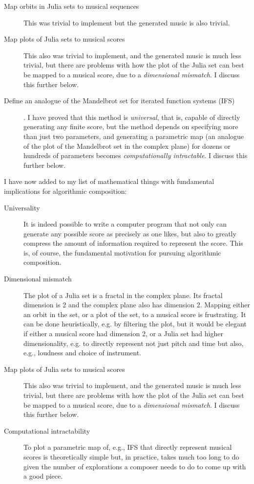 \documentclass[11pt]{amsart}
\begin{document}
\begin{description}
\item[Map orbits in Julia sets to musical sequences] This was trivial to implement but the generated music is also trivial.
\item[Map plots of Julia sets to musical scores] This also was trivial to implement, and the generated music is much less trivial, but there are problems with how the plot of the Julia set can best be mapped to a musical score, due to a \emph{dimensional mismatch}. I discuss this further below.
\item[Define an analogue of the Mandelbrot set for iterated function systems (IFS)]. I have proved that this method is \emph{universal}, that is, capable of directly generating any finite score, but the method depends on specifying more than just two parameters, and generating a parametric map (an analogue of the plot of the Mandelbrot set in the complex plane) for dozens or hundreds of parameters becomes \emph{computationally intractable}. I discuss this further below.
\end{description}

I have now added to my list of mathematical things with fundamental implications for algorithmic composition:

\begin{description}
\item[Universality] It is indeed possible to write a computer program that not only can generate any possible score as precisely as one likes, but also to greatly compress the amount of information required to represent the score. This is, of course, the fundamental motivation for pursuing algorithmic composition.
\item[Dimensional mismatch] The plot of a Julia set is a fractal in the complex plane. Its fractal dimension is 2 and the complex plane also has dimension 2. Mapping either an orbit in the set, or a plot of the set, to a musical score is frustrating. It can be done heuristically, e.g. by filtering the plot, but it would be elegant if either a musical score had dimension 2, or a Julia set had higher dimensionality, e.g. to directly represent not just pitch and time but also, e.g., loudness and choice of instrument.
\item[Map plots of Julia sets to musical scores] This also was trivial to implement, and the generated music is much less trivial, but there are problems with how the plot of the Julia set can best be mapped to a musical score, due to a \emph{dimensional mismatch}. I discuss this further below.
\item[Computational intractability] To plot a parametric map of, e.g., IFS that directly represent musical scores is theoretically simple but, in practice, takes much too long to do given the number of explorations a composer needs to do to come up with a good piece.
\end{description}
\end{document}
